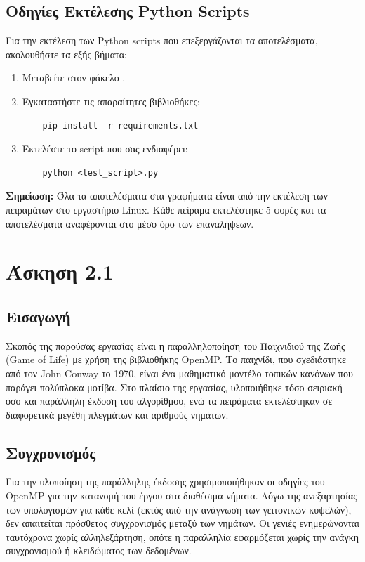 \documentclass{article}
\begin{document}
\subsection*{Οδηγίες Εκτέλεσης Python Scripts}
Για την εκτέλεση των Python scripts που επεξεργάζονται τα αποτελέσματα, ακολουθήστε τα εξής βήματα:
\begin{enumerate}
    \item Μεταβείτε στον φάκελο .
    \item Εγκαταστήστε τις απαραίτητες βιβλιοθήκες:
    \begin{verbatim}
    pip install -r requirements.txt
    \end{verbatim}
    \item Εκτελέστε το script που σας ενδιαφέρει:
    \begin{verbatim}
    python <test_script>.py
    \end{verbatim}
\end{enumerate}
\textbf{Σημείωση:} Όλα τα αποτελέσματα στα γραφήματα είναι από την εκτέλεση των πειραμάτων στο εργαστήριο Linux. Κάθε πείραμα εκτελέστηκε 5 φορές και τα αποτελέσματα αναφέρονται στο μέσο όρο των επαναλήψεων.
\section*{Άσκηση 2.1}
\subsection*{Εισαγωγή}
Σκοπός της παρούσας εργασίας είναι η παραλληλοποίηση του Παιχνιδιού της Ζωής (Game of Life) με χρήση της βιβλιοθήκης OpenMP. Το παιχνίδι, που σχεδιάστηκε από τον John Conway το 1970, είναι ένα μαθηματικό μοντέλο τοπικών κανόνων που παράγει πολύπλοκα μοτίβα. Στο πλαίσιο της εργασίας, υλοποιήθηκε τόσο σειριακή όσο και παράλληλη έκδοση του αλγορίθμου, ενώ τα πειράματα εκτελέστηκαν σε διαφορετικά μεγέθη πλεγμάτων και αριθμούς νημάτων.
\subsection*{Συγχρονισμός}
Για την υλοποίηση της παράλληλης έκδοσης χρησιμοποιήθηκαν οι οδηγίες του OpenMP για την κατανομή του έργου στα διαθέσιμα νήματα. Λόγω της ανεξαρτησίας των υπολογισμών για κάθε κελί (εκτός από την ανάγνωση των γειτονικών κυψελών), δεν απαιτείται πρόσθετος συγχρονισμός μεταξύ των νημάτων. Οι γενιές ενημερώνονται ταυτόχρονα χωρίς αλληλεξάρτηση, οπότε η παραλληλία εφαρμόζεται χωρίς την ανάγκη συγχρονισμού ή κλειδώματος των δεδομένων.
\end{document}
